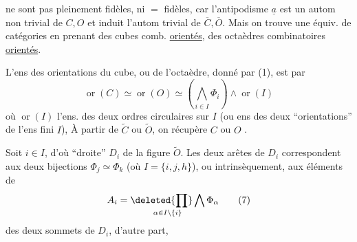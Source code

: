 ne sont pas pleinement fidèles, ni $=$ fidèles, car l'antipodisme $\underline a$ est un autom non trivial de $C,O$ et induit l'autom trivial de $\overline C,\overline O$. Mais on trouve une équiv. de catégories en prenant des cubes comb. \uline{orientés}, des octaèdres combinatoires \uline{orientés}.


L'ens des orientations du cube, ou de l'octaèdre, donné par (1), est    par
\[
 \operatorname{or}(C)\simeq\operatorname{or}(O)\simeq
 \left(\bigwedge_{i\in I}\Phi_i\right)\wedge\operatorname{or}(I)\tag*{(6)}
\]
où $\operatorname{or}(I)$  l'ens. des deux ordres circulaires sur $I$ (ou ens des deux ``orientations'' de l'ens fini $I$),
À partir de $\widetilde C$ ou $\widetilde O$, on récupère $C$ ou $O$  .

Soit $i\in I$, d'où ``droite'' $D_i$ de la figure $\widetilde O$. Les deux arêtes de $D_i$ correspondent aux deux bijections $\Phi_j\simeq\Phi_k$ (où $I=\{i,j,h\}$), ou intrinsèquement, aux éléments de
\[
 A_i=\mathop{\deleted{\prod}\bigwedge}_{\alpha\in I\setminus\{i\}}\Phi_\alpha\tag*{(7)}
\]
  des deux sommets de $D_i$, d'autre part,
